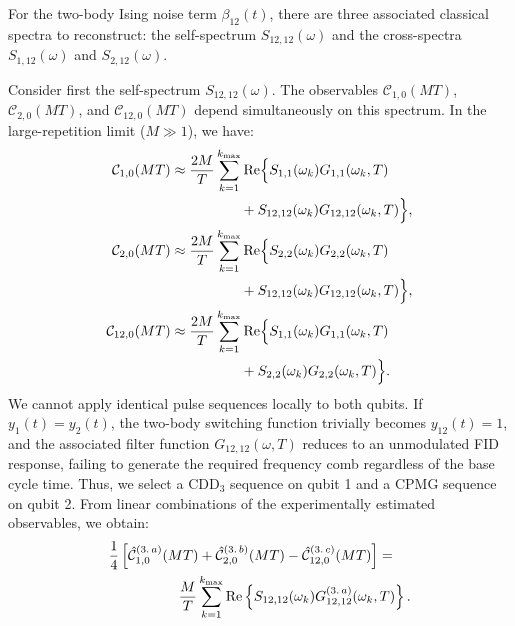 \documentclass[%
 reprint,
superscriptaddress,
 amsmath,amssymb,
 aps,
pra,
floatfix,
]{revtex4-2}
\begin{document}
For the two-body Ising noise term $\beta_{12}(t)$, there are three associated classical spectra to reconstruct: the self-spectrum $S_{12,12}(\omega)$ and the cross-spectra $S_{1,12}(\omega)$ and $S_{2,12}(\omega)$.

Consider first the self-spectrum $S_{12,12}(\omega)$. The observables $\mathcal{C}_{1,0}(MT)$, $\mathcal{C}_{2,0}(MT)$, and $\mathcal{C}_{12,0}(MT)$ depend simultaneously on this spectrum. In the large-repetition limit ($M\gg 1$), we have:
\begin{align}
    \mathcal{C}_{1,0}(MT)&\approx\frac{2M}{T}\sum^{k_{\max}}_{k=1} \text{Re}\Big\{S_{1,1}(\omega_k)G_{1,1}(\omega_k, T)\notag\\
    &\qquad\qquad\quad+S_{12,12}(\omega_k)G_{12,12}(\omega_k, T)\Big\},\\
    \mathcal{C}_{2,0}(MT)&\approx\frac{2M}{T}\sum^{k_{\max}}_{k=1} \text{Re}\Big\{S_{2,2}(\omega_k)G_{2,2}(\omega_k, T)\notag\\
    &\qquad\qquad\quad+S_{12,12}(\omega_k)G_{12,12}(\omega_k, T)\Big\},\\
    \mathcal{C}_{12,0}(MT)&\approx\frac{2M}{T}\sum^{k_{\max}}_{k=1} \text{Re}\Big\{S_{1,1}(\omega_k)G_{1,1}(\omega_k, T)\notag\\
    &\qquad\qquad\quad+S_{2,2}(\omega_k)G_{2,2}(\omega_k, T)\Big\}.
\end{align}
We cannot apply identical pulse sequences locally to both qubits. If $y_1(t) = y_2(t)$, the two-body switching function trivially becomes $y_{12}(t) = 1$, and the associated filter function $G_{12,12}(\omega, T)$ reduces to an unmodulated FID response, failing to generate the required frequency comb regardless of the base cycle time. Thus, we select a $\text{CDD}_3$ sequence on qubit 1 and a CPMG sequence on qubit 2. From linear combinations of the experimentally estimated observables, we obtain:
\begin{align}
    &\frac{1}{4}\left[\hat{\mathcal{C}}_{1,0}^{(3.\,a)}(MT)+\hat{\mathcal{C}}_{2,0}^{(3.\,b)}(MT)-\hat{\mathcal{C}}_{12,0}^{(3.\,c)}(MT)\right]=\notag\\
    &\qquad\qquad\quad\frac{M}{T}\sum^{k_{\max}}_{k=1} \text{Re}\left\{S_{12,12}(\omega_k)G^{(3.\,a)}_{12,12}(\omega_k, T)\right\}.
\end{align}
\end{document}
